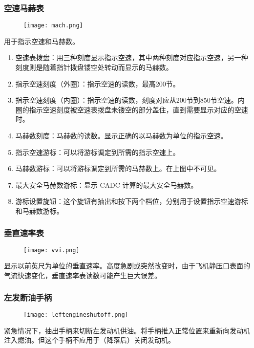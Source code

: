 \subsubsection{空速马赫表}

\begin{figure}[htb]
  \center
  \texttt{[image: mach.png]}
\end{figure}
用于指示空速和马赫数。

\begin{enumerate}
  \item 空速表拨盘：用三种刻度显示指示空速，其中两种刻度对应指示空速，另一种刻度则是随着指针拨盘镂空处转动而显示的马赫数。
  \item 指示空速刻度（外圈）：指示空速的读数，最高200节。
  \item 指示空速刻度（内圈）：指示空速的读数，刻度对应从200节到850节空速。内圈的指示空速刻度被空速表拨盘未镂空的部分盖住，直到需要显示对应的空速时。
  \item 马赫数刻度：马赫数的读数。显示正确的以马赫数为单位的指示空速。
  \item 指示空速游标：可以将游标调定到所需的指示空速上。
  \item 马赫数游标：可以将游标调定到所需的马赫数上。在上图中不可见。
  \item 最大安全马赫数游标：显示 CADC 计算的最大安全马赫数。
  \item 游标设置旋钮：这个旋钮有抽出和按下两个档位，分别用于设置指示空速游标和马赫数游标。
\end{enumerate}

\subsubsection{垂直速率表}

\begin{figure}[htb]
  \center
  \texttt{[image: vvi.png]}
\end{figure}
显示以前英尺为单位的垂直速率。高度急剧或突然改变时，由于飞机静压口表面的气流快速变化，垂直速率表读数可能产生巨大误差。

\subsubsection{左发断油手柄}

\begin{figure}[htb]
  \center
  \texttt{[image: leftengineshutoff.png]}
\end{figure}
紧急情况下，抽出手柄来切断左发动机供油。将手柄推入正常位置来重新向发动机注入燃油。但这个手柄不应用于（降落后）关闭发动机。

